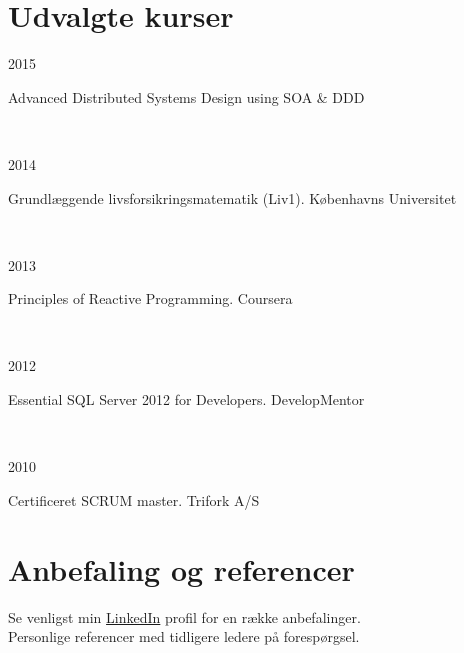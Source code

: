 \documentclass[10pt, a4paper]{article}
\begin{document}
\section{Udvalgte kurser}
\begin{Row}%
  \begin{Cell}{1}
    2015
  \end{Cell}
  \begin{Cell}{3}
    Advanced Distributed Systems Design using SOA \& DDD
  \end{Cell}
\end{Row}
\\[0.5cm]
\begin{Row}%
  \begin{Cell}{1}
    2014
  \end{Cell}
  \begin{Cell}{3}
    Grundlæggende livsforsikringsmatematik (Liv1). Københavns Universitet
  \end{Cell}
\end{Row}
\\[0.5cm]
\begin{Row}%
  \begin{Cell}{1}
    2013
  \end{Cell}
  \begin{Cell}{3}
    Principles of Reactive Programming. Coursera
  \end{Cell}
\end{Row}
\\[0.5cm]
\begin{Row}%
  \begin{Cell}{1}
    2012
  \end{Cell}
  \begin{Cell}{3}
    Essential SQL Server 2012 for Developers. DevelopMentor
  \end{Cell}
\end{Row}
\\[0.5cm]
\begin{Row}%
  \begin{Cell}{1}
    2010
  \end{Cell}
  \begin{Cell}{3}
    Certificeret SCRUM master. Trifork A/S
  \end{Cell}
\end{Row}

\section{Anbefaling og referencer}
Se venligst min \href{https://dk.linkedin.com/in/carstenjoergensen}{LinkedIn} profil for en række anbefalinger.
\\[0.25cm]
Personlige referencer med tidligere ledere på forespørgsel.
\end{document}

